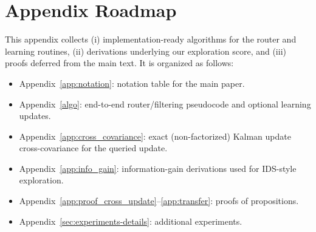 \appendix
\onecolumn

\section{Appendix Roadmap}
\label{app:roadmap}
This appendix collects (i) implementation-ready algorithms for the router and learning routines,
(ii) derivations underlying our exploration score, and (iii) proofs deferred from the main text.
It is organized as follows:
\begin{itemize}
        \item Appendix~\ref{app:notation}: notation table for the main paper.
	    \item Appendix~\ref{algo}: end-to-end router/filtering pseudocode and optional learning updates.
	    \item Appendix~\ref{app:cross_covariance}: exact (non-factorized) Kalman update cross-covariance for the queried update.
	    \item Appendix~\ref{app:info_gain}: information-gain derivations used for IDS-style exploration.
	    \item Appendix~\ref{app:proof_cross_update}--\ref{app:transfer}: proofs of propositions.
    \item Appendix~\ref{sec:experiments-details}: additional experiments.
\end{itemize}

